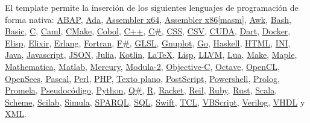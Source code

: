 	\newcommand{\insertsrcmanual}[2]{\href{https://latex.ppizarror.com/informe.html?srctype=#1\#hlp-srccode}{#2}}

	El template permite la inserción de los siguientes lenguajes de programación de forma nativa: \insertsrcmanual{abap}{ABAP}, \insertsrcmanual{ada}{Ada}, \insertsrcmanual{assemblerx64}{Assembler x64}, \insertsrcmanual{assemblerx86}{Assembler x86[masm]}, \insertsrcmanual{awk}{Awk}, \insertsrcmanual{bash}{Bash}, \insertsrcmanual{basic}{Basic}, \insertsrcmanual{c}{C}, \insertsrcmanual{caml}{Caml}, \insertsrcmanual{cmake}{CMake}, \insertsrcmanual{cobol}{Cobol}, \insertsrcmanual{cpp}{C++}, \insertsrcmanual{csharp}{C\#}, \insertsrcmanual{css}{CSS}, \insertsrcmanual{csv}{CSV}, \insertsrcmanual{cuda}{CUDA}, \insertsrcmanual{dart}{Dart}, \insertsrcmanual{docker}{Docker}, \insertsrcmanual{elisp}{Elisp}, \insertsrcmanual{elixir}{Elixir}, \insertsrcmanual{erlang}{Erlang}, \insertsrcmanual{fortran}{Fortran}, \insertsrcmanual{fsharp}{F\#}, \insertsrcmanual{glsl}{GLSL}, \insertsrcmanual{gnuplot}{Gnuplot}, \insertsrcmanual{go}{Go}, \insertsrcmanual{haskell}{Haskell}, \insertsrcmanual{html}{HTML}, \insertsrcmanual{ini}{INI}, \insertsrcmanual{java}{Java}, \insertsrcmanual{javascript}{Javascript}, \insertsrcmanual{json}{JSON}, \insertsrcmanual{julia}{Julia}, \insertsrcmanual{kotlin}{Kotlin}, \insertsrcmanual{latex}{LaTeX}, \insertsrcmanual{lisp}{Lisp}, \insertsrcmanual{llvm}{LLVM}, \insertsrcmanual{lua}{Lua}, \insertsrcmanual{make}{Make}, \insertsrcmanual{maple}{Maple}, \insertsrcmanual{mathematica}{Mathematica}, \insertsrcmanual{matlab}{Matlab}, \insertsrcmanual{mercury}{Mercury}, \insertsrcmanual{modula2}{Modula-2}, \insertsrcmanual{objectivec}{Objective-C}, \insertsrcmanual{octave}{Octave}, \insertsrcmanual{opencl}{OpenCL}, \insertsrcmanual{opensees}{OpenSees}, \insertsrcmanual{pascal}{Pascal}, \insertsrcmanual{perl}{Perl}, \insertsrcmanual{php}{PHP}, \insertsrcmanual{plaintext}{Texto plano}, \insertsrcmanual{postscript}{PostScript}, \insertsrcmanual{powershell}{Powershell}, \insertsrcmanual{prolog}{Prolog}, \insertsrcmanual{promela}{Promela}, \insertsrcmanual{pseudocode}{Pseudocódigo}, \insertsrcmanual{python}{Python}, \insertsrcmanual{qsharp}{Q\#}, \insertsrcmanual{r}{R}, \insertsrcmanual{racket}{Racket}, \insertsrcmanual{reil}{Reil}, \insertsrcmanual{ruby}{Ruby}, \insertsrcmanual{rust}{Rust}, \insertsrcmanual{scala}{Scala}, \insertsrcmanual{scheme}{Scheme}, \insertsrcmanual{scilab}{Scilab}, \insertsrcmanual{simula}{Simula}, \insertsrcmanual{sparql}{SPARQL}, \insertsrcmanual{sql}{SQL}, \insertsrcmanual{swift}{Swift}, \insertsrcmanual{tcl}{TCL}, \insertsrcmanual{vbscript}{VBScript}, \insertsrcmanual{verilog}{Verilog}, \insertsrcmanual{vhdl}{VHDL} y \insertsrcmanual{xml}{XML}. \\


